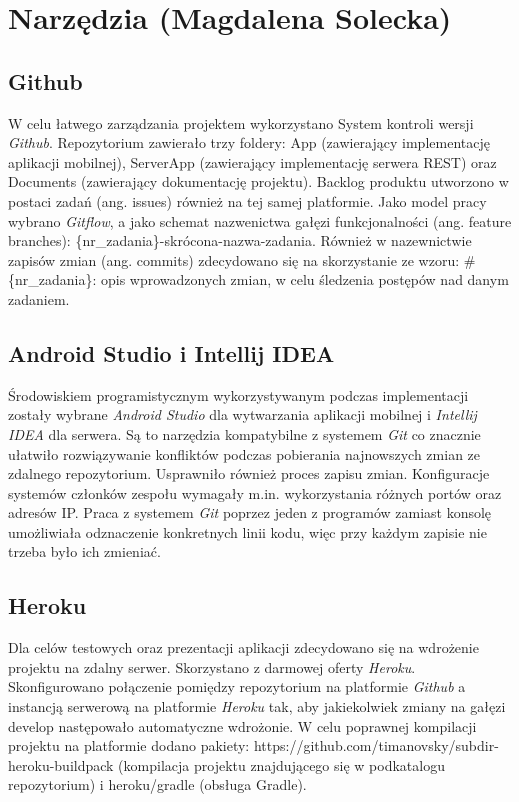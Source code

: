 \documentclass[10pt,twoside,a4paper]{report}
\begin{document}
\section{Narzędzia (Magdalena Solecka)}
\subsection{Github}
\par W celu łatwego zarządzania projektem wykorzystano System kontroli wersji \textit{Github}. Repozytorium zawierało trzy foldery: App (zawierający implementację aplikacji mobilnej), ServerApp (zawierający implementację serwera REST) oraz Documents (zawierający dokumentację projektu). Backlog produktu utworzono w postaci zadań (ang. issues) również na tej samej platformie.  Jako model pracy wybrano \textit{Gitflow}, a jako schemat nazwenictwa gałęzi funkcjonalności (ang. feature branches): \{nr\_zadania\}-skrócona-nazwa-zadania. Również w nazewnictwie zapisów zmian (ang. commits) zdecydowano się na skorzystanie ze wzoru: \#\{nr\_zadania\}: opis wprowadzonych zmian, w celu śledzenia postępów nad danym zadaniem.

\subsection{Android Studio i Intellij IDEA}
\par Środowiskiem programistycznym wykorzystywanym podczas implementacji zostały wybrane \textit{Android Studio} dla wytwarzania aplikacji mobilnej i \textit{Intellij IDEA} dla serwera. Są to narzędzia kompatybilne z systemem \textit{Git} co znacznie ułatwiło rozwiązywanie konfliktów podczas pobierania najnowszych zmian ze zdalnego repozytorium. Usprawniło również proces zapisu zmian. Konfiguracje systemów członków zespołu wymagały m.in. wykorzystania różnych portów oraz adresów IP. Praca z systemem \textit{Git} poprzez jeden z programów zamiast konsolę umożliwiała odznaczenie konkretnych linii kodu, więc przy każdym zapisie nie trzeba było ich zmieniać.

\subsection{Heroku}
\par Dla celów testowych oraz prezentacji aplikacji zdecydowano się na wdrożenie projektu na zdalny serwer. Skorzystano z darmowej oferty \textit{Heroku}. Skonfigurowano połączenie pomiędzy repozytorium na platformie \textit{Github} a instancją serwerową na platformie \textit{Heroku} tak, aby jakiekolwiek zmiany na gałęzi develop następowało automatyczne wdrożonie. W celu poprawnej kompilacji projektu na platformie dodano pakiety: https://github.com/timanovsky/subdir-heroku-buildpack (kompilacja projektu znajdującego się w podkatalogu repozytorium) i heroku/gradle (obsługa Gradle).
\end{document}
